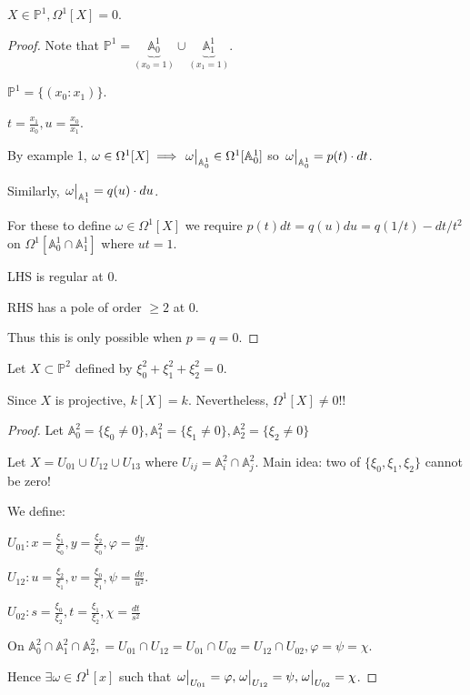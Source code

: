 \documentclass{article}
\theoremstyle{definition}
\begin{document}
    \(X\in \mathbb{P}^1, \Omega^1[X] = 0\).
    
    \begin{proof}
        Note that \(\mathbb{P}^1 = \underbrace{\mathbb{A}^1_0}_{(x_0 = 1)} \cup \underbrace{\mathbb{A}_1^1}_{(x_1 = 1)}\).

        \(\mathbb{P}^1 = \{ (x_0: x_1) \}\).
        
        \(t = \frac{x_1}{x_0}, u = \frac{x_0}{x_1}\).
        
        By example 1, \(\omega \in \Omega^1[X] \implies \eval{\omega}_{\mathbb{A}^1_0} \in \Omega^1 [\mathbb{A}_0^1]\) so \(\eval{\omega}_{\mathbb{A}^1_0} = p(t) \cdot d t\).

        Similarly, \(\eval{\omega}_{\mathbb{A} ^1_1} = q(u) \cdot du \).
        
        For these to define \(\omega \in \Omega^1[X]\) we require \(p(t) dt = q(u) du=  q(1 / t) - dt / t^2\) on \(\Omega^1[\mathbb{A}^1_0 \cap \mathbb{A}^1_1]\) where \(ut = 1\).

        LHS is regular at \(0\).

        RHS has a pole of order \(\geq 2\) at \(0\).
        
        Thus this is only possible when \(p=q=0\).
        
    \end{proof}

    Let \(X \subset \mathbb{P}^2\) defined by \(\xi_0^2 + \xi_1^2 + \xi_2^2 = 0\).

    Since \(X\) is projective, \(k[X] = k\). Nevertheless, \(\Omega^1[X] \neq 0\)!!

    \begin{proof}
        Let \(\mathbb{A}^2_0 = \{ \xi_0\neq 0\}, \mathbb{A}^2_1 = \{ \xi_1 \neq 0 \}, \mathbb{A}^2_2 = \{ \xi_2 \neq 0 \}  \) 

        Let \(X = U_{01} \cup U_{12} \cup U_{13}\) where \(U_{ij} = \mathbb{A}^2_i \cap \mathbb{A}^2_j\). Main idea: two of \(\{ \xi_0, \xi_1, \xi_2 \}\) cannot be zero!

        We define:

        \(U_{01}: x = \frac{\xi_1}{\xi_0}, y = \frac{\xi_2}{\xi_0}, \varphi = \frac{dy}{x^2}\).
        
        \(U_{12}: u = \frac{\xi_2}{\xi_1}, v=\frac{\xi_0}{\xi_1}, \psi = \frac{dv}{u^2}\).
        
        \(U_{02}: s = \frac{\xi_0}{\xi_2}, t = \frac{\xi_1}{\xi_2}, \chi = \frac{dt}{s^2}\)

        On \(\mathbb{A}^2_0 \cap \mathbb{A}^2_1 \cap \mathbb{A}^2_2, = U_{01} \cap U_{12} = U_{01} \cap U_{02} = U_{12}\cap U_{02}, \varphi = \psi = \chi\).
        
        Hence \(\exists \omega \in \Omega^1[x]\) such that \(\eval{\omega}_{U_{01}} = \varphi, \eval{\omega}_{U_{12}} = \psi, \eval{\omega}_{U_{02}}=\chi\).
    \end{proof}
\end{document}
